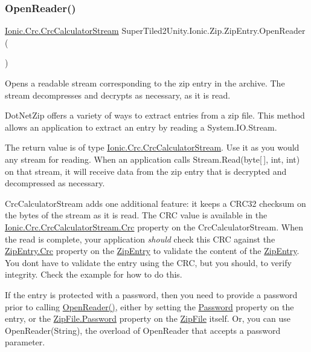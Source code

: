 \subsubsection{\texorpdfstring{Open\+Reader()}{OpenReader()}\hspace{0.1cm}{\footnotesize\ttfamily [1/2]}}
{\footnotesize\ttfamily \mbox{\hyperlink{class_super_tiled2_unity_1_1_ionic_1_1_crc_1_1_crc_calculator_stream}{Ionic.\+Crc.\+Crc\+Calculator\+Stream}} Super\+Tiled2\+Unity.\+Ionic.\+Zip.\+Zip\+Entry.\+Open\+Reader (\begin{DoxyParamCaption}{ }\end{DoxyParamCaption})}



Opens a readable stream corresponding to the zip entry in the archive. The stream decompresses and decrypts as necessary, as it is read. 

Dot\+Net\+Zip offers a variety of ways to extract entries from a zip file. This method allows an application to extract an entry by reading a System.\+I\+O.\+Stream. 

The return value is of type \mbox{\hyperlink{class_super_tiled2_unity_1_1_ionic_1_1_crc_1_1_crc_calculator_stream}{Ionic.\+Crc.\+Crc\+Calculator\+Stream}}. Use it as you would any stream for reading. When an application calls Stream.\+Read(byte\mbox{[}$\,$\mbox{]}, int, int) on that stream, it will receive data from the zip entry that is decrypted and decompressed as necessary. 

{\ttfamily Crc\+Calculator\+Stream} adds one additional feature\+: it keeps a C\+R\+C32 checksum on the bytes of the stream as it is read. The C\+RC value is available in the \mbox{\hyperlink{class_super_tiled2_unity_1_1_ionic_1_1_crc_1_1_crc_calculator_stream_ae9b4d1e28a4cbc040799543643a31e1e}{Ionic.\+Crc.\+Crc\+Calculator\+Stream.\+Crc}} property on the {\ttfamily Crc\+Calculator\+Stream}. When the read is complete, your application {\itshape should} check this C\+RC against the \mbox{\hyperlink{class_super_tiled2_unity_1_1_ionic_1_1_zip_1_1_zip_entry_a4b24fadb05fd70564b92f6618343aa87}{Zip\+Entry.\+Crc}} property on the {\ttfamily \mbox{\hyperlink{class_super_tiled2_unity_1_1_ionic_1_1_zip_1_1_zip_entry}{Zip\+Entry}}} to validate the content of the \mbox{\hyperlink{class_super_tiled2_unity_1_1_ionic_1_1_zip_1_1_zip_entry}{Zip\+Entry}}. You don\textquotesingle{}t have to validate the entry using the C\+RC, but you should, to verify integrity. Check the example for how to do this. 

If the entry is protected with a password, then you need to provide a password prior to calling \mbox{\hyperlink{class_super_tiled2_unity_1_1_ionic_1_1_zip_1_1_zip_entry_a825692bb86f2c5da7eefc1e9714ae18c}{Open\+Reader()}}, either by setting the \mbox{\hyperlink{class_super_tiled2_unity_1_1_ionic_1_1_zip_1_1_zip_entry_a4e1ce23f98c2e3a60a2d47a25a243a82}{Password}} property on the entry, or the \mbox{\hyperlink{class_super_tiled2_unity_1_1_ionic_1_1_zip_1_1_zip_file_a32b5a69438b625f81303940ec70f9c39}{Zip\+File.\+Password}} property on the {\ttfamily \mbox{\hyperlink{class_super_tiled2_unity_1_1_ionic_1_1_zip_1_1_zip_file}{Zip\+File}}} itself. Or, you can use Open\+Reader(\+String), the overload of Open\+Reader that accepts a password parameter. 


